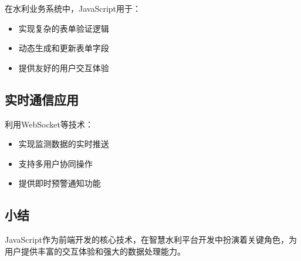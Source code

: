 在水利业务系统中，JavaScript用于：

\begin{itemize}
\tightlist
\item
  实现复杂的表单验证逻辑
\item
  动态生成和更新表单字段
\item
  提供友好的用户交互体验
\end{itemize}

\subsection{实时通信应用}\label{ux5b9eux65f6ux901aux4fe1ux5e94ux7528}

利用WebSocket等技术：

\begin{itemize}
\tightlist
\item
  实现监测数据的实时推送
\item
  支持多用户协同操作
\item
  提供即时预警通知功能
\end{itemize}

\subsection{小结}\label{ux5c0fux7ed3}

JavaScript作为前端开发的核心技术，在智慧水利平台开发中扮演着关键角色，为用户提供丰富的交互体验和强大的数据处理能力。
